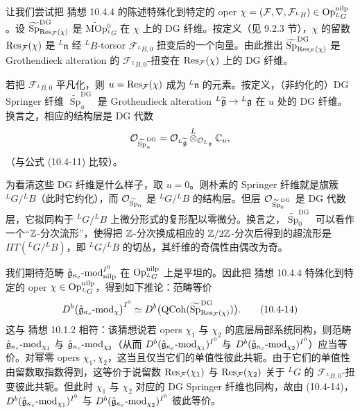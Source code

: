 让我们尝试把 猜想 10.4.4 的陈述特殊化到特定的 oper $\chi=(\mathcal{F},\nabla,\mathcal{F}_{{}^L B})\in\operatorname{Op}^{\mathrm{nilp}}_{{}^L G}$。设 $\widetilde{\operatorname{Sp}}^{\mathrm{DG}}_{\operatorname{Res}_{\mathcal{F}}(\chi)}$ 是 $\widetilde{\mathrm{MOp}}{}^0_{{}^L G}$ 在 $\chi$ 上的 DG 纤维。按定义（见 9.2.3 节），$\chi$ 的留数 $\operatorname{Res}_{\mathcal{F}}(\chi)$ 是 ${}^L\mathfrak{n}$ 经 ${}^L B$-torsor $\mathcal{F}_{{}^L B,0}$ 扭变后的一个向量。由此推出 $\widetilde{\operatorname{Sp}}^{\mathrm{DG}}_{\operatorname{Res}_{\mathcal{F}}(\chi)}$ 是 Grothendieck alteration 的 $\mathcal{F}_{{}^L B,0}$-扭变在 $\operatorname{Res}_{\mathcal{F}}(\chi)$ 上的 DG 纤维。

若把 $\mathcal{F}_{{}^L B,0}$ 平凡化，则 $u=\operatorname{Res}_{\mathcal{F}}(\chi)$ 成为 ${}^L\mathfrak{n}$ 的元素。按定义，（非约化的）DG Springer 纤维 $\widetilde{\operatorname{Sp}}^{\mathrm{DG}}_u$ 是 Grothendieck alteration ${}^L\widetilde{\mathfrak{g}}\to{}^L\mathfrak{g}$ 在 $u$ 处的 DG 纤维。换言之，相应的结构层是 DG 代数
\[
    \mathcal{O}_{\widetilde{\operatorname{Sp}}^{\mathrm{DG}}_u}
    =\mathcal{O}_{{}^L\widetilde{\mathfrak{g}}}
    \overset{L}{\otimes}_{\mathcal{O}_{{}^L\mathfrak{g}}}\mathbb{C}_u,
\]
（与公式 (10.4-11) 比较）。

为看清这些 DG 纤维是什么样子，取 $u=0$。则朴素的 Springer 纤维就是旗簇 ${}^L G/{}^L B$（此时它约化），而 $\mathcal{O}_{\widetilde{\operatorname{Sp}}_0}$ 是 ${}^L G/{}^L B$ 的结构层。但层 $\mathcal{O}_{\widetilde{\operatorname{Sp}}^{\mathrm{DG}}_0}$ 是 DG 代数层，它拟同构于 ${}^L G/{}^L B$ 上微分形式的复形配以零微分。换言之，$\widetilde{\operatorname{Sp}}^{\mathrm{DG}}_0$ 可以看作一个“$\mathbb{Z}$-分次流形”，使得把 $\mathbb{Z}$-分次换成相应的 $\mathbb{Z}/2\mathbb{Z}$-分次后得到的超流形是 $\Pi T({}^L G/{}^L B)$，即 ${}^L G/{}^L B$ 的切丛，其纤维的奇偶性由偶改为奇。

我们期待范畴 $\hat{\mathfrak{g}}_{\kappa_c}\text{-}\mathrm{mod}_{\mathrm{nilp}}^{I^0}$ 在 $\operatorname{Op}^{\mathrm{nilp}}_{{}^L G}$ 上是平坦的。因此把 猜想 10.4.4 特殊化到特定的 oper $\chi\in\operatorname{Op}^{\mathrm{nilp}}_{{}^L G}$，得到如下推论：范畴等价
\begin{equation}
    D^b\bigl(\hat{\mathfrak{g}}_{\kappa_c}\text{-}\mathrm{mod}_\chi\bigr)^{I^0}
    \simeq D^b\bigl(\mathrm{QCoh}(\widetilde{\operatorname{Sp}}^{\mathrm{DG}}_{\operatorname{Res}_{\mathcal{F}}(\chi)})\bigr).
    \tag{10.4-14}
\end{equation}
这与 猜想 10.1.2 相符：该猜想说若 opers $\chi_1$ 与 $\chi_2$ 的底层局部系统同构，则范畴 $\hat{\mathfrak{g}}_{\kappa_c}\text{-}\mathrm{mod}_{\chi_1}$ 与 $\hat{\mathfrak{g}}_{\kappa_c}\text{-}\mathrm{mod}_{\chi_2}$（从而 $D^b(\hat{\mathfrak{g}}_{\kappa_c}\text{-}\mathrm{mod}_{\chi_1})^{I^0}$ 与 $D^b(\hat{\mathfrak{g}}_{\kappa_c}\text{-}\mathrm{mod}_{\chi_2})^{I^0}$）应当等价。对幂零 opers $\chi_1,\chi_2$，这当且仅当它们的单值性彼此共轭。由于它们的单值性由留数取指数得到，这等价于说留数 $\operatorname{Res}_{\mathcal{F}}(\chi_1)$ 与 $\operatorname{Res}_{\mathcal{F}}(\chi_2)$ 关于 ${}^L G$ 的 $\mathcal{F}_{{}^L B,0}$-扭变彼此共轭。但此时 $\chi_1$ 与 $\chi_2$ 对应的 DG Springer 纤维也同构，故由 (10.4-14)，$D^b(\hat{\mathfrak{g}}_{\kappa_c}\text{-}\mathrm{mod}_{\chi_1})^{I^0}$ 与 $D^b(\hat{\mathfrak{g}}_{\kappa_c}\text{-}\mathrm{mod}_{\chi_2})^{I^0}$ 彼此等价。

